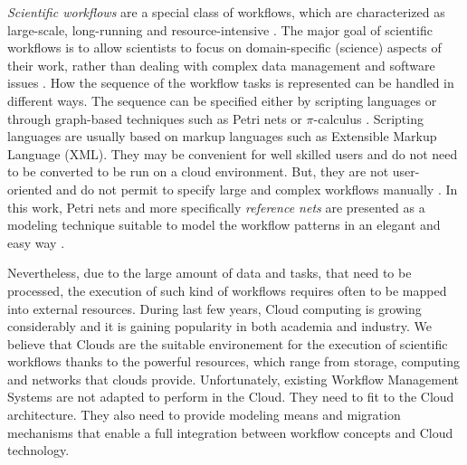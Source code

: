 %
%
\label{sec:introduction}
%
\emph{Scientific workflows} are a special class of workflows, which are characterized as large-scale, long-running and resource-intensive  \cite{scientific}. 
%
The major goal of scientific workflows is to allow scientists to focus on domain-specific (science) aspects of their work, rather than dealing with complex data management and software issues \cite{scientific20}. 
%
How the sequence of the workflow tasks is represented can be handled in different ways.
%
The sequence can be specified either by scripting languages or through graph-based techniques such as Petri nets or $ \pi $-calculus \cite{Aalst03picalculus} \cite{smith04pi}.
%
Scripting languages are usually based on markup languages such as
Extensible Markup Language (XML). They may be convenient for well skilled users and do not need to be converted to be run on a cloud environment. But, they are not user-oriented and do not permit to  specify large and complex workflows manually \cite{hayatndt}. 
%
In this work, Petri nets \cite{petri21} and more specifically \textit{reference nets} \cite{Kummer02} are presented as a modeling technique suitable to model the workflow patterns
in an elegant and easy way \cite{sofiane}.

Nevertheless, due to the large amount of data and tasks, that need to be processed, the execution of such kind of workflows requires often to be mapped into external resources.
%
During last few years, Cloud computing is growing considerably and it is gaining popularity in both academia and industry.
%
We believe that Clouds are the suitable environement for the execution of scientific workflows thanks to the powerful resources, which range from storage, computing and networks that clouds provide.
%
Unfortunately, existing Workflow Management Systems are not adapted to perform in the Cloud.
%
They need to fit to the Cloud architecture.
%
They also need to provide modeling means and migration mechanisms that enable a full integration between workflow concepts and Cloud technology.



